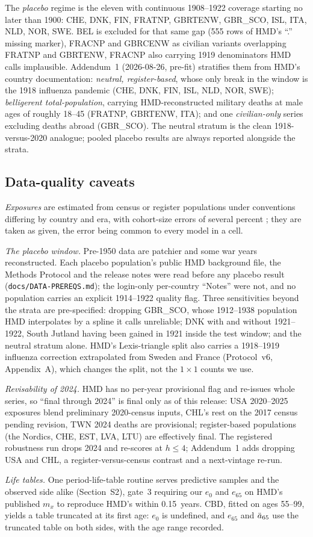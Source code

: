 The \emph{placebo} regime is the eleven with continuous 1908--1922 coverage
starting no later than 1900: CHE, DNK, FIN, FRATNP, GBRTENW, GBR\_SCO, ISL,
ITA, NLD, NOR, SWE. BEL is excluded for that same gap (555 rows of HMD's
``.'' missing marker), FRACNP and GBRCENW as civilian variants overlapping
FRATNP and GBRTENW, FRACNP also carrying 1919 denominators HMD calls
implausible. Addendum~1 (2026-08-26, pre-fit) stratifies them from HMD's
country documentation: \emph{neutral, register-based}, whose only break in
the window is the 1918 influenza pandemic (CHE, DNK, FIN, ISL, NLD, NOR,
SWE); \emph{belligerent total-population}, carrying HMD-reconstructed
military deaths at male ages of roughly 18--45 (FRATNP, GBRTENW, ITA); and
one \emph{civilian-only} series excluding deaths abroad (GBR\_SCO). The
neutral stratum is the clean 1918-versus-2020 analogue; pooled placebo
results are always reported alongside the strata.

\subsection{Data-quality caveats}

\emph{Exposures} are estimated from census or register populations under
conventions differing by country and era, with cohort-size errors of several
percent \citep{cairns2016phantoms}; they are taken as given, the error being
common to every model in a cell.

\emph{The placebo window.} Pre-1950 data are patchier and some war years
reconstructed. Each placebo population's public HMD background file, the
Methods Protocol and the release notes were read before any placebo result
(\texttt{docs/DATA-PREREQS.md}); the login-only per-country ``Notes'' were
not, and no population carries an explicit 1914--1922 quality flag. Three
sensitivities beyond the strata are pre-specified: dropping GBR\_SCO, whose
1912--1938 population HMD interpolates by a spline it calls unreliable; DNK
with and without 1921--1922, South Jutland having been gained in 1921 inside
the test window; and the neutral stratum alone. HMD's Lexis-triangle split
also carries a 1918--1919 influenza correction extrapolated from Sweden and
France (Protocol~v6, Appendix~A), which changes the split, not the
$1\times1$ counts we use.

\emph{Revisability of 2024.} HMD has no per-year provisional flag and
re-issues whole series, so ``final through 2024'' is final only as of this
release: USA 2020--2025 exposures blend preliminary 2020-census inputs, CHL's
rest on the 2017 census pending revision, TWN 2024 deaths are provisional;
register-based populations (the Nordics, CHE, EST, LVA, LTU) are effectively
final. The registered robustness run drops 2024 and re-scores at $h\le4$;
Addendum~1 adds dropping USA and CHL, a register-versus-census contrast and a
next-vintage re-run.

\emph{Life tables.} One period-life-table routine serves predictive samples
and the observed side alike (Section~S2), gate~3 requiring our $e_0$ and
$e_{65}$ on HMD's published $m_x$ to reproduce HMD's within 0.15~years. CBD,
fitted on ages 55--99, yields a table truncated at its first age: $e_0$ is
undefined, and $e_{65}$ and $\ddot{a}_{65}$ use the truncated table on both sides,
with the age range recorded.
